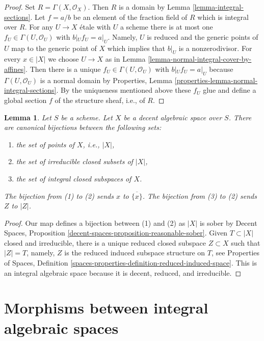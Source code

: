 \documentclass{stacks-project}
\theoremstyle{plain}
\newtheorem{lemma}[subsection]{Lemma}
\theoremstyle{definition}
\theoremstyle{remark}
\numberwithin{equation}{subsection}
\begin{document}
\begin{proof}
Set $R = \Gamma(X, \mathcal{O}_X)$. Then $R$ is a domain by
Lemma \ref{lemma-integral-sections}.
Let $f = a/b$ be an element of the fraction field of $R$
which is integral over $R$.
For any $U \to X$ \'etale with $U$ a scheme there is at most one
$f_U \in \Gamma(U, \mathcal{O}_U)$ with $b|_U f_U = a|_U$.
Namely, $U$ is reduced and the generic points of $U$ map to
the generic point of $X$ which implies that $b|_U$ is a
nonzerodivisor.
For every $x \in |X|$ we choose $U \to X$ as in
Lemma \ref{lemma-normal-integral-cover-by-affines}.
Then there is a unique $f_U \in \Gamma(U, \mathcal{O}_U)$
with $b|_U f_U = a|_U$ because
$\Gamma(U, \mathcal{O}_U)$ is a normal domain by
Properties, Lemma \ref{properties-lemma-normal-integral-sections}.
By the uniqueness mentioned above these $f_U$
glue and define a global section $f$ of the structure
sheaf, i.e., of $R$.
\end{proof}

\begin{lemma}
\label{lemma-decent-irreducible-closed}
Let $S$ be a scheme. Let $X$ be a decent algebraic space over $S$.
There are canonical bijections between the following sets:
\begin{enumerate}
\item the set of points of $X$, i.e., $|X|$,
\item the set of irreducible closed subsets of $|X|$,
\item the set of integral closed subspaces of $X$.
\end{enumerate}
The bijection from (1) to (2) sends $x$ to $\overline{\{x\}}$.
The bijection from (3) to (2) sends $Z$ to $|Z|$.
\end{lemma}

\begin{proof}
Our map defines a bijection between (1) and (2) as $|X|$ is
sober by 
Decent Spaces, Proposition \ref{decent-spaces-proposition-reasonable-sober}.
Given $T \subset |X|$ closed and irreducible, there is a
unique reduced closed subspace $Z \subset X$ such that
$|Z| = T$, namely, $Z$ is the reduced induced subspace structure
on $T$, see Properties of Spaces, Definition
\ref{spaces-properties-definition-reduced-induced-space}.
This is an integral algebraic space because it is decent,
reduced, and irreducible.
\end{proof}






\section{Morphisms between integral algebraic spaces}
\label{section-morphisms-between-integral-spaces}
\end{document}
